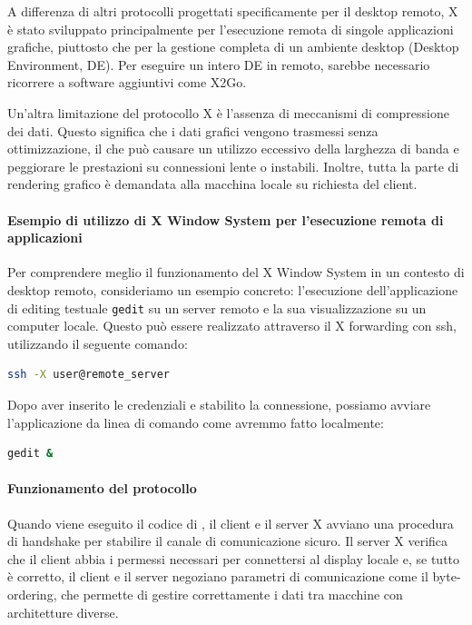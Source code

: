\documentclass[12pt,a4paper,openright,twoside]{book}
\begin{document}
A differenza di altri protocolli progettati specificamente per il desktop remoto,
X è stato sviluppato principalmente per l'esecuzione remota di singole applicazioni grafiche,
piuttosto che per la gestione completa di un ambiente desktop (Desktop Environment, DE).
%
Per eseguire un intero DE in remoto, sarebbe necessario ricorrere a software aggiuntivi come X2Go.

Un'altra limitazione del protocollo X è l'assenza di meccanismi di compressione dei dati.
Questo significa che i dati grafici vengono trasmessi senza ottimizzazione,
il che può causare un utilizzo eccessivo della larghezza di banda e peggiorare le prestazioni su connessioni lente o instabili.
%
Inoltre, tutta la parte di rendering grafico è demandata alla macchina locale su richiesta del client.

\paragraph{Esempio di utilizzo di X Window System per l'esecuzione remota di applicazioni}

Per comprendere meglio il funzionamento del X Window System in un contesto di desktop remoto, consideriamo un esempio concreto:
l'esecuzione dell'applicazione di editing testuale \texttt{gedit} su un server remoto e la sua visualizzazione su un computer locale.
Questo può essere realizzato attraverso il X forwarding con ssh, utilizzando il seguente comando:

\begin{lstlisting}[caption={Connessione remota con X forwarding}, label={lst:ssh-x}, language=bash]
ssh -X user@remote_server
\end{lstlisting}

Dopo aver inserito le credenziali e stabilito la connessione, possiamo avviare l'applicazione da linea di comando come avremmo fatto localmente:

\begin{lstlisting}[caption={Esecuzione di gedit su server remoto}, label={lst:gedit}, language=bash]
gedit &
\end{lstlisting}

\paragraph{Funzionamento del protocollo}

Quando viene eseguito il codice di ,
il client e il server X avviano una procedura di handshake per stabilire il canale di comunicazione sicuro.
%
Il server X verifica che il client abbia i permessi necessari per connettersi al display locale e,
se tutto è corretto,
il client e il server negoziano parametri di comunicazione come il byte-ordering,
che permette di gestire correttamente i dati tra macchine con architetture diverse.
\end{document}
